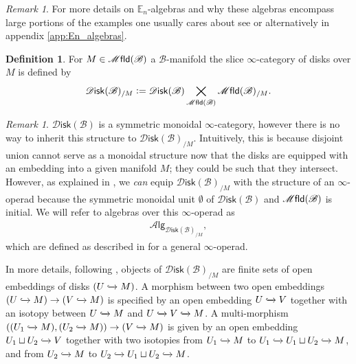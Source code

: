 \documentclass[12pt,a4paper]{article}
\newcounter{counter} \numberwithin{counter}{section}
\theoremstyle{definition}
\newtheorem{definition}[counter]{Definition}
\theoremstyle{plain}
\theoremstyle{remark}
\newtheorem{remark}[counter]{Remark}
\newcommand{\mfld}[1][s]{%
    \ifx r#1\mathsf{Mfld}\else
    \ifx s#1\mathscr{M} \mathsf{fld}\else
    \mathrm{Illegal~option}%
    \fi\fi
}
\newcommand{\disk}{\mathscr{D} \mathsf{isk}}
\newcommand{\alg}[1]{\mathscr{A} \mathsf{lg}_{#1}}
\newcommand{\bstr}{\mathscr{B}}
\begin{document}
\begin{remark}
    For more details on $\mathbb{E}_n$-algebras and why these algebras encompass large portions of the examples one usually cares about see \cite[sec.5.1]{lurie_ha} or alternatively in appendix \cref{app:En_algebras}.
\end{remark}

\begin{definition}
    For $M \in \mfld(\bstr)$ a $\bstr$-manifold the slice $\infty$-category of disks over $M$ is defined by
    \begin{align}
        \disk(\bstr)_{/M} := \disk(\bstr) \bigtimes\limits_{\mfld(\bstr)} \mfld(\bstr)_{/M}.
    \end{align}
\end{definition}

\begin{remark}
    $\disk(\bstr)$ is a symmetric monoidal $\infty$-category, however there is no way to inherit this structure to $\disk(\bstr)_{/M}$. Intuitively, this is because disjoint union cannot serve as a monoidal structure now that the disks are equipped with an embedding into a given manifold $M$; they could be such that they intersect. However, as explained in \cite[not.1.21]{aft_fhstrat}, we \emph{can} equip $\disk(\bstr)_{/M}$ with the structure of an $\infty$-operad because the symmetric monoidal unit $\emptyset$ of $\disk(\bstr)$ and $\mfld(\bstr)$ is initial. We will refer to algebras over this $\infty$-operad as
    \begin{align}
        \alg{\disk(\bstr)_{/M}},
    \end{align}
    which are defined as described in \cite{lurie_ha} for a general $\infty$-operad.

    In more details, following \cite[ex.2.5]{aft_fhstrat}, objects of $\disk(\bstr)_{/M}$ are finite sets of open embeddings of disks $(U \xhookrightarrow{} M)$. A morphism between two open embeddings $(U \xhookrightarrow{} M) \rightarrow (V \xhookrightarrow{} M)$ is specified by an open embedding $U \xhookrightarrow{} V$ together with an isotopy between $U \xhookrightarrow{} M$ and $U \xhookrightarrow{} V \xhookrightarrow{} M$. A multi-morphism $((U_1 \xhookrightarrow{} M), (U_2 \xhookrightarrow{} M)) \rightarrow (V \xhookrightarrow{} M)$ is given by an open embedding $U_1 \sqcup U_2 \xhookrightarrow{} V$ together with two isotopies from $U_1 \xhookrightarrow{} M$ to $U_1 \xhookrightarrow{} U_1 \sqcup U_2 \xhookrightarrow{} M$, and from $U_2 \xhookrightarrow{} M$ to $U_2 \xhookrightarrow{} U_1 \sqcup U_2 \xhookrightarrow{} M$.
\end{remark}
\end{document}
